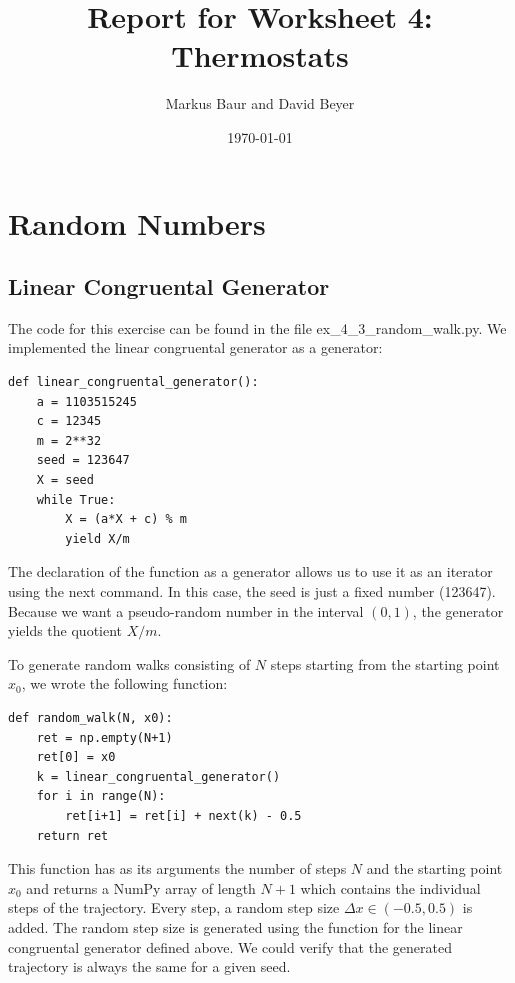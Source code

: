 \documentclass[a4paper,10pt,bibtotoc]{scrartcl}
\begin{document}
\titlehead{Simulation Methods in Physics I \hfill WS 2019/2010}
\title{Report for Worksheet 4: Thermostats}
\author{Markus Baur and David Beyer}
\date{\today}
\maketitle

\tableofcontents

\section{Random Numbers}
\subsection{Linear Congruental Generator}
The code for this exercise can be found in the file ex\_4\_3\_random\_walk.py.
We implemented the linear congruental generator as a generator:
\begin{lstlisting}
def linear_congruental_generator():
    a = 1103515245
    c = 12345
    m = 2**32
    seed = 123647
    X = seed
    while True:
        X = (a*X + c) % m
        yield X/m
\end{lstlisting}
The declaration of the function as a generator allows us to use it as an iterator using the next command. 
In this case, the seed is just a fixed number (123647). Because we want a pseudo-random number in the interval $(0,1)$, the generator yields the quotient $X/m$.

To generate random walks consisting of $N$ steps starting from the starting point $x_0$, we wrote the following function:
\begin{lstlisting}
def random_walk(N, x0):
    ret = np.empty(N+1)
    ret[0] = x0
    k = linear_congruental_generator()
    for i in range(N):
        ret[i+1] = ret[i] + next(k) - 0.5
    return ret
\end{lstlisting}
This function has as its arguments the number of steps $N$ and the starting point $x_0$ and returns a NumPy array of length $N+1$ which contains the individual steps of the trajectory.
Every step, a random step size $\Delta x\in (-0.5,0.5)$ is added.
The random step size is generated using the function for the linear congruental generator defined above.
We could verify that the generated trajectory is always the same for a given seed.
\end{document}
